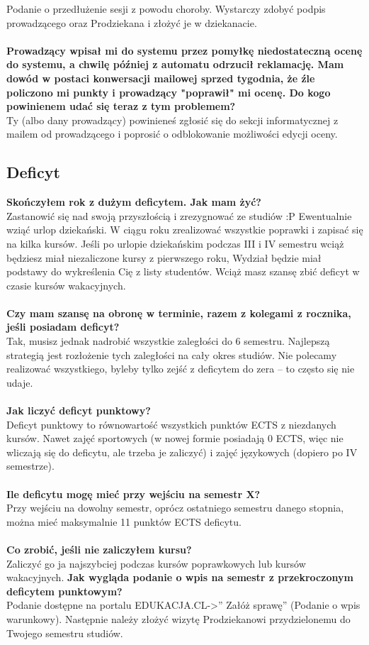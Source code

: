 \documentclass[11pt]{article}
\begin{document}
\indent Podanie o przedłużenie sesji z powodu choroby. Wystarczy zdobyć podpis prowadzącego oraz Prodziekana i złożyć je w dziekanacie. \\\\
\textbf{Prowadzący wpisał mi do systemu przez pomyłkę niedostateczną ocenę do systemu, a chwilę później z automatu odrzucił reklamację. Mam dowód w postaci konwersacji mailowej sprzed tygodnia, że źle policzono mi punkty i prowadzący "poprawił" mi ocenę. Do kogo powinienem udać się teraz z tym problemem?} \\
\indent Ty (albo dany prowadzący) powinieneś zgłosić się do sekcji informatycznej z mailem od prowadzącego i poprosić o odblokowanie możliwości edycji oceny. 
\subsection{Deficyt}
\textbf{Skończyłem rok z dużym deficytem. Jak mam żyć?} \\
\indent Zastanowić się nad swoją przyszłością i zrezygnować ze studiów :P Ewentualnie wziąć urlop dziekański. W ciągu roku zrealizować wszystkie poprawki i zapisać się na kilka kursów. Jeśli po urlopie dziekańskim podczas III i IV semestru wciąż będziesz miał niezaliczone kursy z pierwszego roku, Wydział będzie miał podstawy do wykreślenia Cię z listy studentów. Wciąż masz szansę zbić deficyt w czasie kursów wakacyjnych. \\\\
\textbf{Czy mam szansę na obronę w terminie, razem z kolegami z rocznika, jeśli posiadam deficyt?} \\
\indent Tak, musisz jednak nadrobić wszystkie zaległości do 6 semestru. Najlepszą strategią jest rozłożenie tych zaległości na cały okres studiów. Nie polecamy realizować wszystkiego, byleby tylko zejść z deficytem do zera – to często się nie udaje. \\\\
\textbf{Jak liczyć deficyt punktowy?} \\
\indent Deficyt punktowy to równowartość wszystkich punktów ECTS z niezdanych kursów. Nawet zajęć sportowych (w nowej formie posiadają 0 ECTS, więc nie wliczają się do deficytu, ale trzeba je zaliczyć) i zajęć językowych (dopiero po IV semestrze). \\\\
\textbf{Ile deficytu mogę mieć przy wejściu na semestr X?} \\
\indent Przy wejściu na dowolny semestr, oprócz ostatniego semestru danego stopnia, można mieć maksymalnie 11 punktów ECTS deficytu. \\\\
\textbf{Co zrobić, jeśli nie zaliczyłem kursu?} \\
\indent Zaliczyć go ja najszybciej podczas kursów poprawkowych lub kursów wakacyjnych.
\newpage
\noindent \textbf{Jak wygląda podanie o wpis na semestr z przekroczonym deficytem punktowym?} \\
\indent Podanie dostępne na portalu EDUKACJA.CL->” Załóż sprawę” (Podanie o wpis warunkowy). Następnie należy złożyć wizytę Prodziekanowi przydzielonemu do Twojego semestru studiów.
\end{document}
